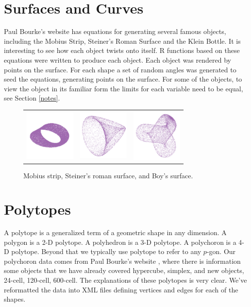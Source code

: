 \section{Surfaces and Curves}

Paul Bourke's website \citep{PBCurves} has equations for generating
several famous objects, including the Mobius Strip, Steiner's Roman
Surface and the Klein Bottle. It is interesting to see how each object
twists onto itself.  R functions based on these equations were written
to produce each object.  Each object was rendered by points on the
surface. For each shape a set of random angles was generated to seed
the equations, generating points on the surface.  For some of the
objects, to view the object in its familiar form the limits for each
variable need to be equal, see Section \ref{notes}.

\begin{figure}[ht]
\centering
\begin{tabular}{ccc}
\includegraphics[width=1in]{fig/mobius.pdf}&\includegraphics[width=1in]{fig/roman.pdf}&\includegraphics[width=1in]{fig/boy-surface.pdf}
\end{tabular}
\caption{Mobius strip, Steiner's roman surface, and Boy's surface.}
\end{figure}

\section{Polytopes}

A polytope is a generalized term of a geometric shape in any
dimension. A polygon is a 2-D polytope. A polyhedron is a 3-D
polytope. A polychoron is a 4-D polytope. Beyond that we typically use
polytope to refer to any $p$-gon.  Our polychoron data comes from Paul
Bourke's website \citep{PBPlatonic}, where there is information some
objects that we have already covered hypercube, simplex, and new
objects, 24-cell, 120-cell, 600-cell.  The explanations of these
polytopes is very clear. We've reformatted the data into XML files
defining vertices and edges for each of the shapes.

